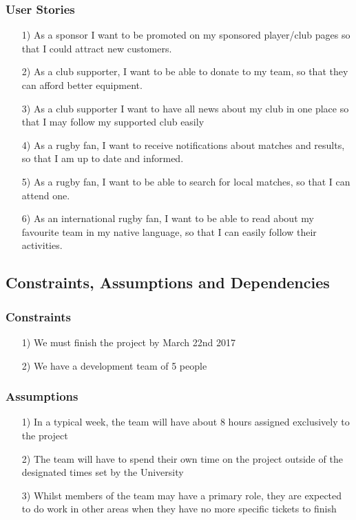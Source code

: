 \documentclass[10pt,a4paper]{article}
\begin{document}
\subsubsection{User Stories}

\begin{itemize}

\item[1)]
As a sponsor
I want to be promoted on my sponsored player/club pages
so that I could attract new customers.

\item[2)]
As a club supporter,
I want to be able to donate to my team,
so that they can afford better equipment.

\item[3)]
As a club supporter
I want to have all news about my club in one place
so that I may follow my supported club easily

\item[4)]
As a rugby fan,
I want to receive notifications about matches and results,
so that I am up to date and informed.

\item[5)]
As a rugby fan,
I want to be able to search for local matches,
so that I can attend one.

\item[6)]
As an international rugby fan,
I want to be able to read about my favourite team in my native language,
so that I can easily follow their activities.

\end{itemize}

\subsection{Constraints, Assumptions and Dependencies}

\subsubsection*{Constraints}
\begin{itemize}
\item[1)]
We must finish the project by March 22nd 2017

\item[2)]
We have a development team of 5 people
\end{itemize}

\subsubsection*{Assumptions}
\begin{itemize}
\item[1)]
In a typical week, the team will have about 8 hours assigned exclusively to the project

\item[2)]
The team will have to spend their own time on the project outside of the designated times set by the University

\item[3)]
Whilst members of the team may have a primary role, they are expected to do work in other areas when they have no more specific tickets to finish
\end{itemize}
\end{document}
